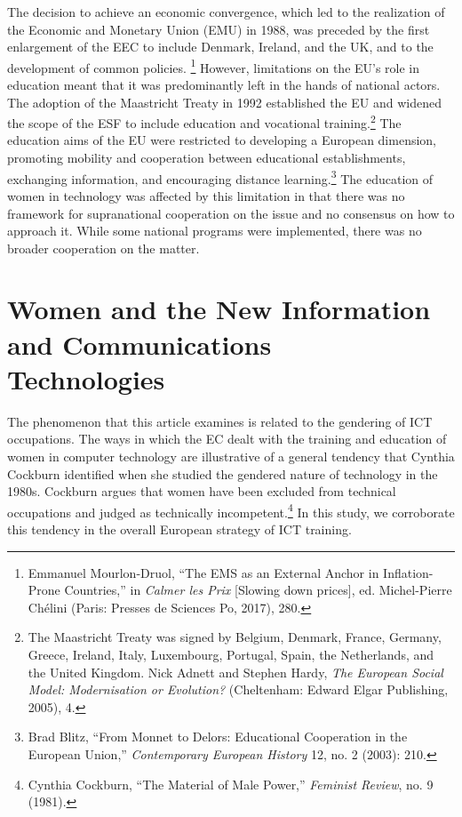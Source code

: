 \documentclass{tufte-handout}
\begin{document}
The decision to achieve an economic convergence, which led to the
realization of the Economic and Monetary Union (EMU) in 1988, was
preceded by the first enlargement of the EEC to include Denmark,
Ireland, and the UK, and to the development of common policies.
\footnote{Emmanuel Mourlon-Druol, ``The EMS as an External Anchor in
  Inflation-Prone Countries,'' in \emph{Calmer les Prix} {[}Slowing down
  prices{]}, ed. Michel-Pierre Chélini (Paris: Presses de Sciences Po,
  2017), 280.} However, limitations on the EU's role in education meant
that it was predominantly left in the hands of national actors. The
adoption of the Maastricht Treaty in 1992 established the EU and widened
the scope of the ESF to include education and vocational
training.\footnote{The Maastricht Treaty was signed by Belgium, Denmark,
  France, Germany, Greece, Ireland, Italy, Luxembourg, Portugal, Spain,
  the Netherlands, and the United Kingdom. Nick Adnett and Stephen
  Hardy, \emph{The European Social Model: Modernisation or Evolution?}
  (Cheltenham: Edward Elgar Publishing, 2005), 4.} The education aims of
the EU were restricted to developing a European dimension, promoting
mobility and cooperation between educational establishments, exchanging
information, and encouraging distance learning.\footnote{Brad Blitz,
  ``From Monnet to Delors: Educational Cooperation in the European
  Union,'' \emph{Contemporary European History} 12, no. 2 (2003): 210.}
The education of women in technology was affected by this limitation in
that there was no framework for supranational cooperation on the issue
and no consensus on how to approach it. While some national programs
were implemented, there was no broader cooperation on the matter.

\hypertarget{women-and-the-new-information-and-communications-technologies}{%
\section{Women and the New Information and Communications\\\noindent
Technologies}\label{women-and-the-new-information-and-communications-technologies}}

The phenomenon that this article examines is related to the gendering of
ICT occupations. The ways in which the EC dealt with the training and
education of women in computer technology are illustrative of a general
tendency that Cynthia Cockburn identified when she studied the gendered
nature of technology in the 1980s. Cockburn argues that women have been
excluded from technical occupations and judged as technically
incompetent.\footnote{Cynthia Cockburn, ``The Material of Male Power,''
  \emph{Feminist Review}, no. 9 (1981).} In this study, we corroborate
this tendency in the overall European strategy of ICT training.
\end{document}
